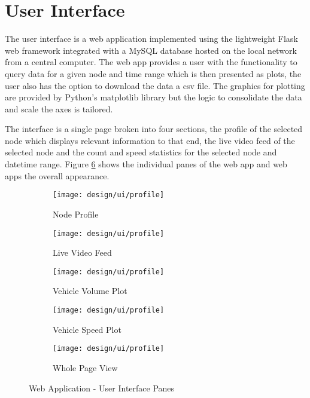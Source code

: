 \section{User Interface}

The user interface is a web application implemented using the lightweight Flask web framework integrated with a MySQL database hosted on the local network from a central computer. The web app provides a user with the functionality to query data for a given node and time range which is then presented as plots, the user also has the option to download the data a csv file. The graphics for plotting are provided by Python's matplotlib library but the logic to consolidate the data and scale the axes is tailored. 

The interface is a single page broken into four sections, the profile of the selected node which displays relevant information to that end, the live video feed of the selected node and the count and speed statistics for the selected node and datetime range. Figure \ref{fig:dragonfly} shows the individual panes of the web app and web apps the overall appearance.

\begin{figure}[H]
	\centering
    \begin{subfigure}[b]{0.5\linewidth}
        \centering\texttt{[image: design/ui/profile]}
        \caption{Node Profile}
        \label{fig:}
    \end{subfigure}%
    \begin{subfigure}[b]{0.5\linewidth}
        \centering\texttt{[image: design/ui/profile]}
        \caption{Live Video Feed}
        \label{fig:}
    \end{subfigure}
    \begin{subfigure}[b]{0.5\linewidth}
        \centering\texttt{[image: design/ui/profile]}
        \caption{Vehicle Volume Plot}
        \label{fig:}
    \end{subfigure}
    \begin{subfigure}[b]{0.5\linewidth}
        \centering\texttt{[image: design/ui/profile]}
        \caption{Vehicle Speed Plot}
        \label{fig:}
    \end{subfigure}
    \begin{subfigure}[b]{0.5\linewidth}
        \centering\texttt{[image: design/ui/profile]}
        \caption{Whole Page View}
            \label{fig:}
    \end{subfigure}
    	\caption{Web Application - User Interface Panes}
    	\label{fig:dragonfly}
\end{figure}


